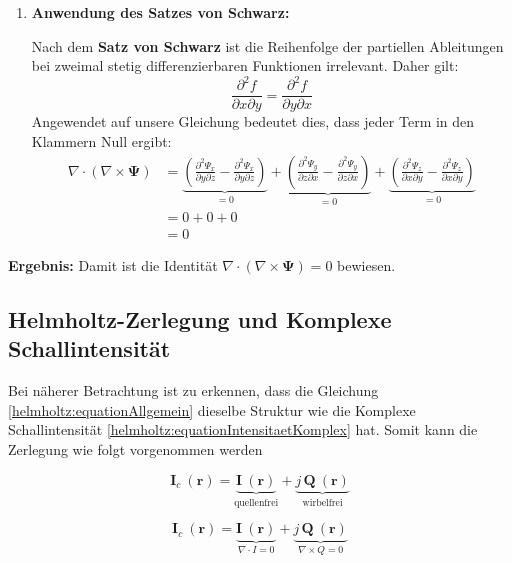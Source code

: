 \begin{enumerate}
    \item \textbf{Anwendung des Satzes von Schwarz:}
    
    Nach dem \textbf{Satz von Schwarz} ist die Reihenfolge der partiellen Ableitungen bei zweimal stetig differenzierbaren Funktionen irrelevant. Daher gilt:
    \[
    \frac{\partial^2 f}{\partial x \partial y} = \frac{\partial^2 f}{\partial y \partial x}
    \]
    Angewendet auf unsere Gleichung bedeutet dies, dass jeder Term in den Klammern Null ergibt:
    \begin{align*}
    \nabla \cdot (\nabla \times \mathbf{\Psi}) &= \underbrace{\left( \frac{\partial^2 \Psi_x}{\partial y \partial z} - \frac{\partial^2 \Psi_x}{\partial y \partial z} \right)}_{=0} + \underbrace{\left( \frac{\partial^2 \Psi_y}{\partial z \partial x} - \frac{\partial^2 \Psi_y}{\partial z \partial x} \right)}_{=0} + \underbrace{\left( \frac{\partial^2 \Psi_z}{\partial x \partial y} - \frac{\partial^2 \Psi_z}{\partial x \partial y} \right)}_{=0} \\[1em]
    &= 0 + 0 + 0 \\[1em]
    &= 0
    \end{align*}

\end{enumerate}

\textbf{Ergebnis:} Damit ist die Identität $\nabla \cdot (\nabla \times \mathbf{\Psi}) = 0$ bewiesen.

\subsection{Helmholtz-Zerlegung und Komplexe Schallintensität}

Bei näherer Betrachtung ist zu erkennen, dass die Gleichung \eqref{helmholtz:equationAllgemein} dieselbe Struktur wie die Komplexe Schallintensität \eqref{helmholtz:equationIntensitaetKomplex} hat. Somit kann die Zerlegung wie folgt vorgenommen werden

\begin{equation}
\mathbf{I}_c ~(\mathbf{r}) = \underbrace{\mathbf{I}~(\mathbf{r})}_{\text{quellenfrei}} + \underbrace{j\,\mathbf{Q}~(\mathbf{r})}_{\text{wirbelfrei}}
\label{helmholtz:KomplexeIntensitaet_Zerlegung}
\end{equation}

\begin{equation}
\mathbf{I}_c ~(\mathbf{r}) = \underbrace{\mathbf{I}~(\mathbf{r})}_{\nabla \cdot I = 0} + \underbrace{j\,\mathbf{Q}~(\mathbf{r})}_{\nabla \times Q = 0}
\label{helmholtz:KomplexeIntensitaet_Zerlegung}
\end{equation}

